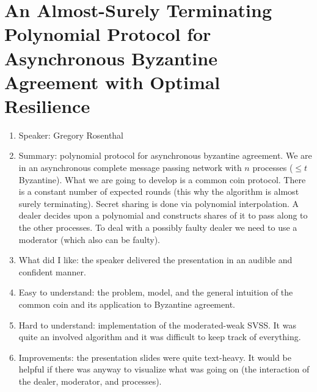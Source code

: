 \documentclass[twoside]{article}
\begin{document}
\section{An Almost-Surely Terminating Polynomial Protocol for Asynchronous Byzantine Agreement with Optimal Resilience}
\begin{enumerate}
\item Speaker: Gregory Rosenthal
\item Summary: polynomial protocol for asynchronous byzantine agreement. We are in an asynchronous complete message passing network with $n$ processes ($\leq t$ Byzantine). What we are going to develop is a common coin protocol. There is a constant number of expected rounds (this why the algorithm is almost surely terminating). Secret sharing is done via polynomial interpolation. A dealer decides upon a polynomial and constructs shares of it to pass along to the other processes. To deal with a possibly faulty dealer we need to use a moderator (which also can be faulty).   
\item What did I like: the speaker delivered the presentation in an audible and confident manner.  
\item Easy to understand: the problem, model, and the general intuition of the common coin and its application to Byzantine agreement. 
\item Hard to understand: implementation of the moderated-weak SVSS. It was quite an involved algorithm and it was difficult to keep track of everything. 
\item Improvements: the presentation slides were quite text-heavy. It would be helpful if there was anyway to visualize what was going on (the interaction of the dealer, moderator, and processes).
\end{enumerate}
\end{document}
